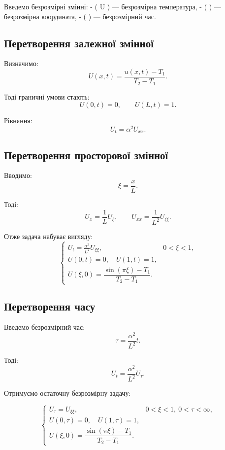 \documentclass[
  ukrainian,
]{article}
\begin{document}
Введемо безрозмірні змінні: - ( U ) --- безрозмірна температура, - (
\xi ) --- безрозмірна координата, - ( \tau ) --- безрозмірний час.

\subsection{Перетворення залежної
змінної}\label{ux43fux435ux440ux435ux442ux432ux43eux440ux435ux43dux43dux44f-ux437ux430ux43bux435ux436ux43dux43eux457-ux437ux43cux456ux43dux43dux43eux457}

Визначимо: \[
U(x,t) = \frac{u(x,t) - T_1}{T_2 - T_1}.
\]

Тоді граничні умови стають: \[
U(0,t)=0, \qquad U(L,t)=1.
\]

Рівняння: \[
U_t = \alpha^2 U_{xx}.
\]

\subsection{Перетворення просторової
змінної}\label{ux43fux435ux440ux435ux442ux432ux43eux440ux435ux43dux43dux44f-ux43fux440ux43eux441ux442ux43eux440ux43eux432ux43eux457-ux437ux43cux456ux43dux43dux43eux457}

Вводимо: \[
\xi = \frac{x}{L}.
\]

Тоді: \[
U_x = \frac{1}{L} U_\xi, \qquad U_{xx} = \frac{1}{L^2} U_{\xi\xi}.
\]

Отже задача набуває вигляду: \[
\begin{cases}
U_t = \frac{\alpha^2}{L^2} U_{\xi\xi}, & 0 < \xi < 1, \\
U(0,t)=0,\quad U(1,t)=1, \\
U(\xi,0)=\dfrac{\sin(\pi \xi)-T_1}{T_2-T_1}.
\end{cases}
\]

\subsection{Перетворення
часу}\label{ux43fux435ux440ux435ux442ux432ux43eux440ux435ux43dux43dux44f-ux447ux430ux441ux443}

Введемо безрозмірний час: \[
\tau = \frac{\alpha^2}{L^2} t.
\]

Тоді: \[
U_t = \frac{\alpha^2}{L^2} U_\tau.
\]

Отримуємо остаточну безрозмірну задачу:

\[
\begin{cases}
U_\tau = U_{\xi\xi}, & 0 < \xi < 1,\ 0 < \tau < \infty, \\
U(0,\tau)=0,\quad U(1,\tau)=1, \\
U(\xi,0)=\dfrac{\sin(\pi \xi)-T_1}{T_2-T_1}.
\end{cases}
\]
\end{document}
